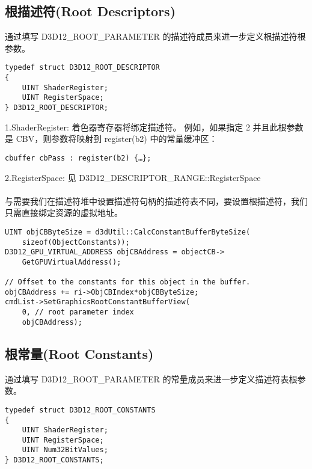 \subsection{根描述符(Root Descriptors)}
\begin{flushleft}
通过填写 D3D12\_ROOT\_PARAMETER 的描述符成员来进一步定义根描述符根参数。\\
\end{flushleft}

\begin{lstlisting}
typedef struct D3D12_ROOT_DESCRIPTOR
{
    UINT ShaderRegister;
    UINT RegisterSpace;
} D3D12_ROOT_DESCRIPTOR;
\end{lstlisting}

\begin{flushleft}
1.ShaderRegister: 着色器寄存器将绑定描述符。 例如，如果指定 2 并且此根参数是 CBV，则参数将映射到 register(b2) 中的常量缓冲区：\\
\end{flushleft}
\begin{lstlisting}
cbuffer cbPass : register(b2) {…};
\end{lstlisting}
\begin{flushleft}
2.RegisterSpace: 见 D3D12\_DESCRIPTOR\_RANGE::RegisterSpace\\
~\\
与需要我们在描述符堆中设置描述符句柄的描述符表不同，要设置根描述符，我们只需直接绑定资源的虚拟地址。\\
\end{flushleft}
\begin{lstlisting}
UINT objCBByteSize = d3dUtil::CalcConstantBufferByteSize(
    sizeof(ObjectConstants));
D3D12_GPU_VIRTUAL_ADDRESS objCBAddress = objectCB->
    GetGPUVirtualAddress();

// Offset to the constants for this object in the buffer.
objCBAddress += ri->ObjCBIndex*objCBByteSize;
cmdList->SetGraphicsRootConstantBufferView(
    0, // root parameter index
    objCBAddress);
\end{lstlisting}

\subsection{根常量(Root Constants)}
\begin{flushleft}
通过填写 D3D12\_ROOT\_PARAMETER 的常量成员来进一步定义描述符表根参数。\\
\end{flushleft}
\begin{lstlisting}
typedef struct D3D12_ROOT_CONSTANTS
{
    UINT ShaderRegister;
    UINT RegisterSpace;
    UINT Num32BitValues;
} D3D12_ROOT_CONSTANTS;
\end{lstlisting}

